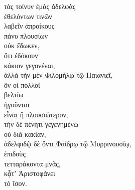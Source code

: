 {\large
\begin{greek}
\noindent τὰς τοίνυν ἐμὰς ἀδελφὰς \\
\tabto{2em} ἐθελόντων τινῶν \\
\tabto{4em} λαβεῖν ἀπροίκους \\
\tabto{2em} πάνυ πλουσίων \\
οὐκ ἔδωκεν, \\
\tabto{2em} ὅτι ἐδόκουν \\
\tabto{4em} κάκιον γεγονέναι, \\
ἀλλὰ τὴν μὲν Φιλομήλῳ τῷ Παιανιεῖ, \\
\tabto{2em} ὃν οἱ πολλοὶ \\
\tabto{4em} βελτίω \\
\tabto{2em} ἡγοῦνται \\
\tabto{4em} εἶναι ἢ πλουσιώτερον, \\
τὴν δὲ πένητι γεγενημένῳ \\
\tabto{2em} οὐ διὰ κακίαν, \\
ἀδελφιδῷ δὲ ὄντι Φαίδρῳ τῷ Μυρρινουσίῳ, \\
ἐπιδοὺς \\
\tabto{2em} τετταράκοντα μνᾶς, \\
κᾆτʼ Ἀριστοφάνει \\
\tabto{2em} τὸ ἴσον.\\
\end{greek}
}

